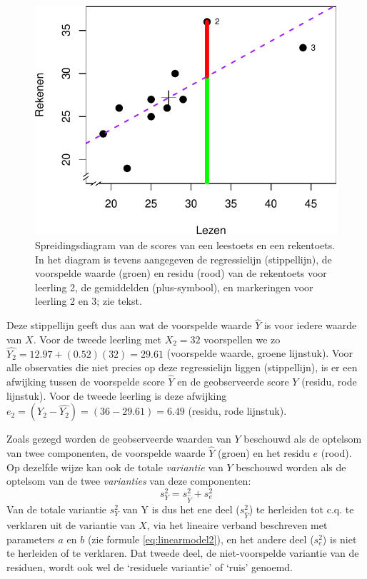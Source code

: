 \documentclass[
]{book}
\begin{document}
\begin{figure}

{\centering \includegraphics{KMS-NL_files/figure-latex/cito-linearmodel-1} 

}

\caption{Spreidingsdiagram van de scores van een leestoets en een rekentoets. In het diagram is tevens aangegeven de regressielijn (stippellijn), de voorspelde waarde (groen) en residu (rood) van de rekentoets voor leerling 2, de gemiddelden (plus-symbool), en markeringen voor leerling 2 en 3; zie tekst.}\label{fig:cito-linearmodel}
\end{figure}

Deze stippellijn geeft dus aan wat de voorspelde waarde \(\widehat{Y}\) is
voor iedere waarde van \(X\). Voor de tweede leerling met \(X_2 = 32\)
voorspellen we zo \(\widehat{Y_2} = 12.97 + (0.52) (32) = 29.61\)
(voorspelde waarde, groene lijnstuk). Voor alle observaties die niet
precies op deze regressielijn liggen (stippellijn),
is er een afwijking tussen de voorspelde
score \(\widehat{Y}\) en de geobserveerde score \(Y\) (residu, rode
lijnstuk). Voor de tweede leerling is deze afwijking
\(e_2 = (Y_2 - \widehat{Y_2}) = (36-29.61) = 6.49\) (residu, rode
lijnstuk).

Zoals gezegd worden de geobserveerde waarden van \(Y\) beschouwd als de
optelsom van twee componenten, de voorspelde waarde \(\widehat{Y}\)
(groen) en het residu \(e\) (rood). Op dezelfde wijze kan ook de totale
\emph{variantie} van \(Y\) beschouwd worden als de optelsom van de twee
\emph{varianties} van deze componenten:
\begin{equation}
    s^2_{Y} = s^2_{\widehat{Y}} + s^2_e
  \label{eq:variance-pred-res}
\end{equation}
Van de totale variantie
\(s^2_Y\) van Y is dus het ene deel (\(s^2_{\widehat{Y}}\)) te herleiden tot
c.q. te verklaren uit de variantie van \(X\), via het lineaire verband
beschreven met parameters \(a\) en \(b\) (zie
formule \eqref{eq:linearmodel2}), en het andere deel (\(s^2_e\)) is niet te
herleiden of te verklaren. Dat tweede deel, de niet-voorspelde variantie
van de residuen, wordt ook wel de `residuele variantie' of `ruis'
genoemd.
\end{document}
